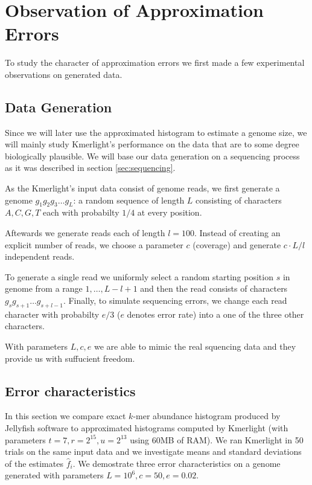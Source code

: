 \section{Observation of Approximation Errors}
To study the character of approximation errors we first made a few experimental
observations on generated data.

\subsection{Data Generation}
\label{sec:data-generation}
Since we will later use the approximated histogram to estimate a genome size, 
we will mainly study Kmerlight's performance on the data that are to some
degree biologically plausible. We will base our data generation on a sequencing
process as it was described in section \ref{sec:sequencing}.

As the Kmerlight's input data consist of genome reads, we first generate a genome $g_1g_2g_3 \dots g_L$:
a random sequence of length $L$ consisting of characters $A, C, G, T$ each with probabilty $1/4$ at every position.

Aftewards we generate reads each of length $l=100$. Instead of creating an explicit number of reads, we choose
a parameter $c$ (coverage) and generate $c \cdot L / l$ independent reads.

To generate a single read we uniformly select a random starting position $s$ in genome from a range $1, \dots, L - l + 1$
and then the read consists of characters $g_s g_{s+1} \dots g_{s+l-1}$. Finally, to simulate sequencing errors,
we change each read character with probabilty $e/3$ ($e$ denotes error rate) into a one of the three other characters.

With parameters $L, c, e$ we are able to mimic the real squencing data and they provide us with suffucient freedom.


\subsection{Error characteristics}

In this section we compare exact $k$-mer abundance histogram produced by Jellyfish software
to approximated histograms computed by Kmerlight (with parameters $t=7, r=2^{15}, u=2^{13}$ using 60MB of RAM).
We ran Kmerlight in 50 trials on the same input data and we investigate means and standard deviations of 
the estimates $\hat f_i$. We demostrate three error characteristics on a genome generated with parameters $L=10^6, c=50, e=0.02$.

